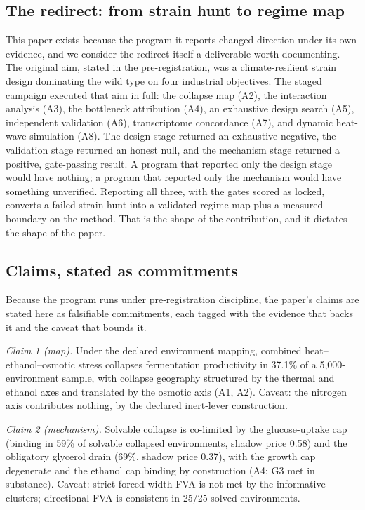 \documentclass[12pt]{article}
\begin{document}
\subsection{The redirect: from strain hunt to regime map}

This paper exists because the program it reports changed direction
under its own evidence, and we consider the redirect itself a
deliverable worth documenting. The original aim, stated in the
pre-registration, was a climate-resilient strain design dominating
the wild type on four industrial objectives. The staged campaign
executed that aim in full: the collapse map (A2), the interaction
analysis (A3), the bottleneck attribution (A4), an exhaustive design
search (A5), independent validation (A6), transcriptome concordance
(A7), and dynamic heat-wave simulation (A8). The design stage
returned an exhaustive negative, the validation stage returned an
honest null, and the mechanism stage returned a positive,
gate-passing result. A program that reported only the design stage
would have nothing; a program that reported only the mechanism would
have something unverified. Reporting all three, with the gates
scored as locked, converts a failed strain hunt into a validated
regime map plus a measured boundary on the method. That is the shape
of the contribution, and it dictates the shape of the paper.


\subsection{Claims, stated as commitments}

Because the program runs under pre-registration discipline, the
paper's claims are stated here as falsifiable commitments, each tagged
with the evidence that backs it and the caveat that bounds it.

\emph{Claim 1 (map).} Under the declared environment mapping, combined
heat--ethanol--osmotic stress collapses fermentation productivity in
37.1\% of a 5{,}000-environment sample, with collapse geography
structured by the thermal and ethanol axes and translated by the
osmotic axis (A1, A2). Caveat: the nitrogen axis contributes nothing,
by the declared inert-lever construction.

\emph{Claim 2 (mechanism).} Solvable collapse is co-limited by the
glucose-uptake cap (binding in 59\% of solvable collapsed
environments, shadow price 0.58) and the obligatory glycerol drain
(69\%, shadow price 0.37), with the growth cap degenerate and the
ethanol cap binding by construction (A4; G3 met in substance).
Caveat: strict forced-width FVA is not met by the informative
clusters; directional FVA is consistent in 25/25 solved environments.
\end{document}
